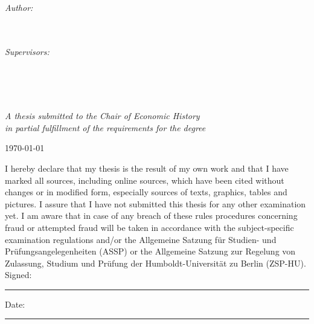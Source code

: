 \documentclass[
12pt, %
english, %
onehalfspacing, %
oneside,
headsepline, %
openany
]{MastersDoctoralThesis} %
\begin{document}
\begin{titlepage}
\begin{center}
\begin{minipage}[t]{0.4\textwidth}
\begin{flushleft} \large
\emph{Author:}\\
{\authorname}\\ %
{\id}\\
\end{flushleft}
\end{minipage}
\begin{minipage}[t]{0.4\textwidth}
\begin{flushright} \large
\emph{Supervisors:} \\
{\supname}\\
{\secsupname}\\
\end{flushright}
\end{minipage}\\[1cm]
 
\vfill

\large \textit{A thesis submitted to the Chair of Economic History\\
in partial fulfillment of the requirements for the degree \degreename }\\[1cm]%
 
\vfill

{\large \today}\\[1cm] %
 
\vfill
\end{center}
\end{titlepage}


\begin{declaration}
\addchaptertocentry{\authorshipname} %
\noindent
I hereby declare that my thesis is the result of my own work and that I have marked all sources, including online sources, which have been cited without changes or in modified form, especially sources of texts, graphics, tables and pictures.
\break\break
\noindent
I assure that I have not submitted this thesis for any other examination yet.
\break\break
\noindent
I am aware that in case of any breach of these rules procedures concerning fraud or attempted fraud will be taken in accordance with the subject-specific examination regulations and/or the Allgemeine Satzung für Studien- und Prüfungsangelegenheiten (ASSP) or the Allgemeine Satzung zur Regelung von Zulassung, Studium und Prüfung der Humboldt-Universität zu Berlin (ZSP-HU).
\break\break
\noindent Signed:\\
\rule[0.5em]{25em}{0.5pt} %
 
\noindent Date:\\
\rule[0.5em]{25em}{0.5pt} %
\end{declaration}
\end{document}
